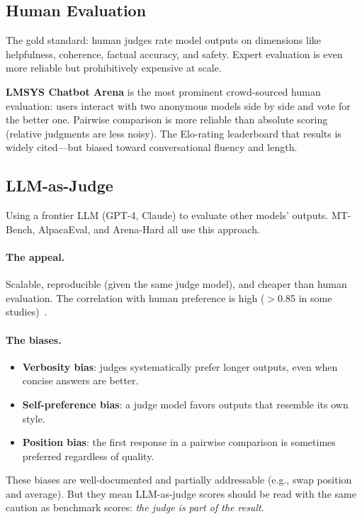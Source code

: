 \subsection{Human Evaluation}

The gold standard: human judges rate model outputs on dimensions like helpfulness, coherence, factual accuracy, and safety. Expert evaluation is even more reliable but prohibitively expensive at scale.

\textbf{LMSYS Chatbot Arena} is the most prominent crowd-sourced human evaluation: users interact with two anonymous models side by side and vote for the better one. Pairwise comparison is more reliable than absolute scoring (relative judgments are less noisy). The Elo-rating leaderboard that results is widely cited---but biased toward conversational fluency and length.

\subsection{LLM-as-Judge}

Using a frontier LLM (GPT-4, Claude) to evaluate other models' outputs. MT-Bench, AlpacaEval, and Arena-Hard all use this approach.

\paragraph{The appeal.} Scalable, reproducible (given the same judge model), and cheaper than human evaluation. The correlation with human preference is high ($>$0.85 in some studies)~\cite{zheng2023judging}.

\paragraph{The biases.}
\begin{itemize}[nosep]
  \item \textbf{Verbosity bias}: judges systematically prefer longer outputs, even when concise answers are better.
  \item \textbf{Self-preference bias}: a judge model favors outputs that resemble its own style.
  \item \textbf{Position bias}: the first response in a pairwise comparison is sometimes preferred regardless of quality.
\end{itemize}

These biases are well-documented and partially addressable (e.g., swap position and average). But they mean LLM-as-judge scores should be read with the same caution as benchmark scores: \emph{the judge is part of the result}.

